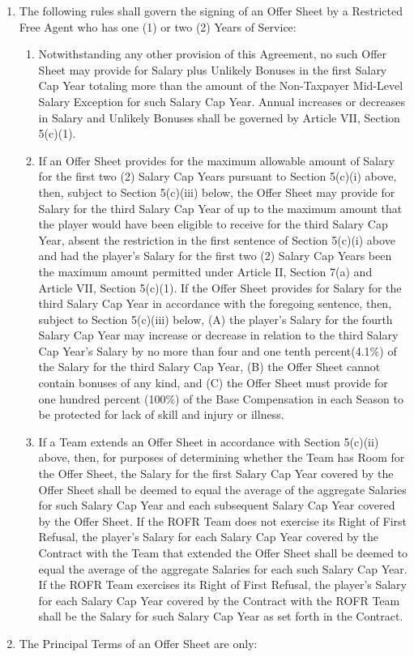 \documentclass[
]{book}
\providecommand{\tightlist}{%
  \setlength{\itemsep}{0pt}\setlength{\parskip}{0pt}}
\begin{document}
\begin{enumerate}
\item
  The following rules shall govern the signing of an Offer Sheet by a Restricted Free Agent who has one (1) or two (2) Years of Service:

  \begin{enumerate}
  \def\labelenumii{(\roman{enumii})}
  \tightlist
  \item
    Notwithstanding any other provision of this Agreement, no such Offer Sheet may provide for Salary plus Unlikely Bonuses in the first Salary Cap Year totaling more than the amount of the Non-Taxpayer Mid-Level Salary Exception for such Salary Cap Year. Annual increases or decreases in Salary and Unlikely Bonuses shall be governed by Article VII, Section 5(c)(1).
  \item
    If an Offer Sheet provides for the maximum allowable amount of Salary for the first two (2) Salary Cap Years pursuant to Section 5(c)(i) above, then, subject to Section 5(c)(iii) below, the Offer Sheet may provide for Salary for the third Salary Cap Year of up to the maximum amount that the player would have been eligible to receive for the third Salary Cap Year, absent the restriction in the first sentence of Section 5(c)(i) above and had the player's Salary for the first two (2) Salary Cap Years been the maximum amount permitted under Article II, Section 7(a) and Article VII, Section 5(c)(1). If the Offer Sheet provides for Salary for the third Salary Cap Year in accordance with the foregoing sentence, then, subject to Section 5(c)(iii) below, (A) the player's Salary for the fourth Salary Cap Year may increase or decrease in relation to the third Salary Cap Year's Salary by no more than four and one tenth percent(4.1\%) of the Salary for the third Salary Cap Year, (B) the Offer Sheet cannot contain bonuses of any kind, and (C) the Offer Sheet must provide for one hundred percent (100\%) of the Base Compensation in each Season to be protected for lack of skill and injury or illness.
  \item
    If a Team extends an Offer Sheet in accordance with Section 5(c)(ii) above, then, for purposes of determining whether the Team has Room for the Offer Sheet, the Salary for the first Salary Cap Year covered by the Offer Sheet shall be deemed to equal the average of the aggregate Salaries for such Salary Cap Year and each subsequent Salary Cap Year covered by the Offer Sheet. If the ROFR Team does not exercise its Right of First Refusal, the player's Salary for each Salary Cap Year covered by the Contract with the Team that extended the Offer Sheet shall be deemed to equal the average of the aggregate Salaries for each such Salary Cap Year. If the ROFR Team exercises its Right of First Refusal, the player's Salary for each Salary Cap Year covered by the Contract with the ROFR Team shall be the Salary for such Salary Cap Year as set forth in the Contract.
  \end{enumerate}
\item
  The Principal Terms of an Offer Sheet are only:


\end{enumerate}
\end{document}

